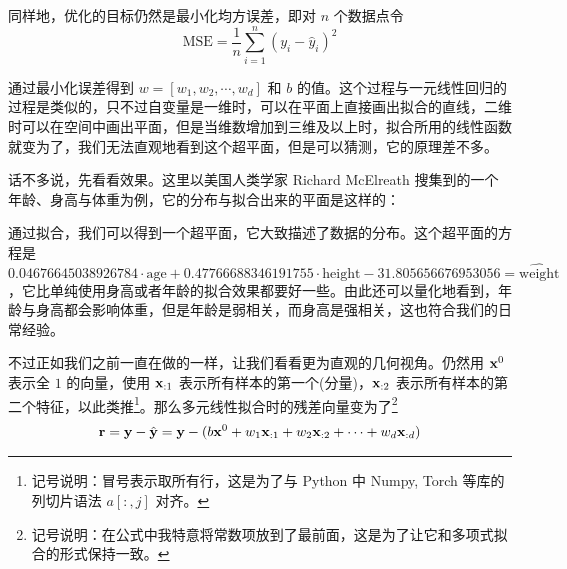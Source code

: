 同样地，优化的目标仍然是最小化均方误差，即对 $n$ 个数据点令
\[
    \text{MSE} = \frac{1}{n} \sum_{i=1}^{n} (y_i - \hat y_i)^2
\]

通过最小化误差得到 $w = [w_1, w_2, \cdots, w_d]$ 和 $b$ 的值。这个过程与一元线性回归的过程是类似的，只不过自变量是一维时，可以在平面上直接画出拟合的直线，二维时可以在空间中画出平面，但是当维数增加到三维及以上时，拟合所用的线性函数就变为了，我们无法直观地看到这个超平面，但是可以猜测，它的原理差不多。

话不多说，先看看效果。这里以美国人类学家 Richard McElreath 搜集到的一个年龄、身高与体重为例，它的分布与拟合出来的平面是这样的：

\begin{figure}[H]
    \centering
\end{figure}

通过拟合，我们可以得到一个超平面，它大致描述了数据的分布。这个超平面的方程是 $0.04676645038926784 \cdot \text{age} + 0.47766688346191755 \cdot \text{height} - 31.805656676953056 = \hat{\text{weight}}$，它比单纯使用身高或者年龄的拟合效果都要好一些。由此还可以量化地看到，年龄与身高都会影响体重，但是年龄是弱相关，而身高是强相关，这也符合我们的日常经验。

不过正如我们之前一直在做的一样，让我们看看更为直观的几何视角。仍然用 ${\mathbf{x}}^0$ 表示全 $1$ 的向量，使用 ${\mathbf{x}}_{:1}$ 表示所有样本的第一个(分量)，${\mathbf{x}}_{:2}$ 表示所有样本的第二个特征，以此类推\footnote{记号说明：冒号表示取所有行，这是为了与 Python 中 Numpy, Torch 等库的列切片语法 $a[:, j]$ 对齐。}。那么多元线性拟合时的残差向量变为了\footnote{记号说明：在公式中我特意将常数项放到了最前面，这是为了让它和多项式拟合的形式保持一致。}
\[
    \begin{aligned}
        {\mathbf{r}} = {\mathbf{y}} - \hat {{\mathbf{y}}} = {\mathbf{y}} - (b {\mathbf{x}}^0 + w_1 {\mathbf{x}}_{:1} + w_2 {\mathbf{x}}_{:2} + \cdots + w_d {\mathbf{x}}_{:d})
    \end{aligned}
\]

